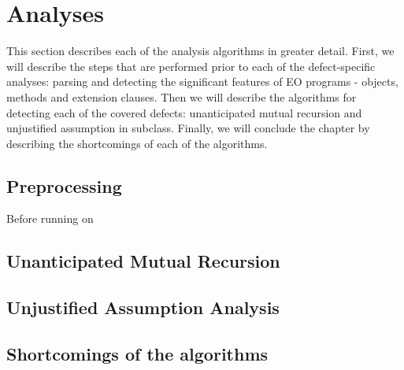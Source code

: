 \section{Analyses}
This section describes each of the analysis algorithms in greater detail. First, we will describe the steps that are performed prior to each of the defect-specific analyses: parsing and detecting the significant features of EO programs - objects, methods and extension clauses. Then we will describe the algorithms for detecting each of the covered defects: unanticipated mutual recursion and unjustified assumption in subclass. Finally, we will conclude the chapter by describing the shortcomings of each of the algorithms.


\subsection{Preprocessing}
Before running on


\subsection{Unanticipated Mutual Recursion}

\subsection{Unjustified Assumption Analysis}

\subsection{Shortcomings of the algorithms}
